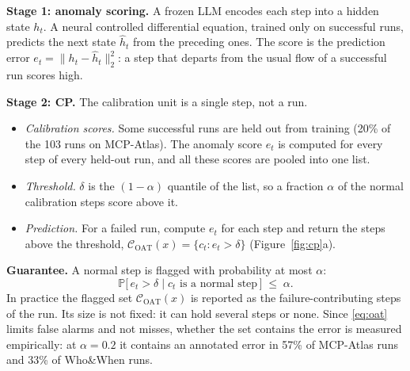 \documentclass[11pt,a4paper]{article}
\newcommand{\C}{\mathcal{C}}
\newcommand{\Prob}{\mathbb{P}}
\begin{document}
\textbf{Stage 1: anomaly scoring.} A frozen LLM encodes each step into a hidden state $h_t$. A neural controlled differential equation, trained only on successful runs, predicts the next state $\hat h_t$ from the preceding ones. The score is the prediction error $e_t=\lVert h_t-\hat h_t\rVert_2^2$: a step that departs from the usual flow of a successful run scores high.

\textbf{Stage 2: CP.} The calibration unit is a single step, not a run.
\begin{itemize}
\item \emph{Calibration scores.} Some successful runs are held out from training (20\% of the 103 runs on MCP-Atlas). The anomaly score $e_t$ is computed for every step of every held-out run, and all these scores are pooled into one list.
\item \emph{Threshold.} $\delta$ is the $(1-\alpha)$ quantile of the list, so a fraction $\alpha$ of the normal calibration steps score above it.
\item \emph{Prediction.} For a failed run, compute $e_t$ for each step and return the steps above the threshold, $\C_{\mathrm{OAT}}(x)=\{c_t: e_t>\delta\}$ (Figure~\ref{fig:cp}a).
\end{itemize}

\textbf{Guarantee.} A normal step is flagged with probability at most $\alpha$:
\begin{equation}
\Prob\big[\,e_t>\delta \;\big|\; c_t \text{ is a normal step}\,\big]\;\le\;\alpha. \label{eq:oat}
\end{equation}
In practice the flagged set $\C_{\mathrm{OAT}}(x)$ is reported as the failure-contributing steps of the run. Its size is not fixed: it can hold several steps or none. Since \eqref{eq:oat} limits false alarms and not misses, whether the set contains the error is measured empirically: at $\alpha=0.2$ it contains an annotated error in 57\% of MCP-Atlas runs and 33\% of Who\&When runs.
\end{document}
